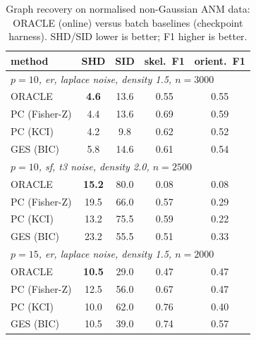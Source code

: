 \begin{table}[htbp]
\centering
\caption{Graph recovery on normalised non-Gaussian ANM data: ORACLE (online) versus batch baselines (checkpoint harness). SHD/SID lower is better; F1 higher is better.}
\label{tab:recovery}
\begin{tabular}{lcccc}
\hline
method & SHD & SID & skel.\ F1 & orient.\ F1 \\
\hline
\hline
\multicolumn{5}{l}{\emph{$p=10$, er, laplace noise, density 1.5, $n=3000$ }} \\
\hline
\quad ORACLE & \textbf{4.6} & 13.6 & 0.55 & 0.55 \\
\quad PC (Fisher-Z) & 4.4 & 13.6 & 0.69 & 0.59 \\
\quad PC (KCI) & 4.2 & 9.8 & 0.62 & 0.52 \\
\quad GES (BIC) & 5.8 & 14.6 & 0.61 & 0.54 \\
\hline
\multicolumn{5}{l}{\emph{$p=10$, sf, t3 noise, density 2.0, $n=2500$ }} \\
\hline
\quad ORACLE & \textbf{15.2} & 80.0 & 0.08 & 0.08 \\
\quad PC (Fisher-Z) & 19.5 & 66.0 & 0.57 & 0.29 \\
\quad PC (KCI) & 13.2 & 75.5 & 0.59 & 0.22 \\
\quad GES (BIC) & 23.2 & 55.5 & 0.51 & 0.33 \\
\hline
\multicolumn{5}{l}{\emph{$p=15$, er, laplace noise, density 1.5, $n=2000$ }} \\
\hline
\quad ORACLE & \textbf{10.5} & 29.0 & 0.47 & 0.47 \\
\quad PC (Fisher-Z) & 12.5 & 56.0 & 0.67 & 0.47 \\
\quad PC (KCI) & 10.0 & 62.0 & 0.76 & 0.40 \\
\quad GES (BIC) & 10.5 & 39.0 & 0.74 & 0.57 \\
\hline
\end{tabular}
\end{table}
